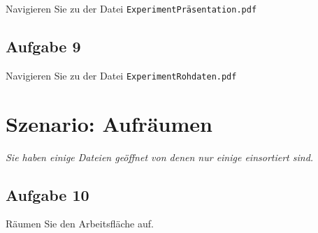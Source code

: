 \documentclass[12pt,]{article}
\begin{document}
Navigieren Sie zu der Datei \texttt{ExperimentPräsentation.pdf}

\newpage

\subsection{Aufgabe 9}

Navigieren Sie zu der Datei \texttt{ExperimentRohdaten.pdf}

\newpage

\section{Szenario: Aufräumen}

\emph{Sie haben einige Dateien geöffnet von denen nur einige einsortiert
sind.}

\subsection{Aufgabe 10}

Räumen Sie den Arbeitsfläche auf.
\end{document}
